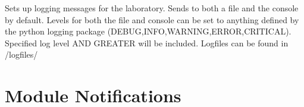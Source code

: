 \documentclass[letterpaper,10pt,english]{sphinxmanual}
\begin{document}

\begin{fulllineitems}
\label{\detokenize{source/laboratory.utils:laboratory.utils.loggers.lab}}
Sets up logging messages for the laboratory. Sends to both a file and the console by default. Levels for both the file and console can be set to anything defined by the
python logging package (DEBUG,INFO,WARNING,ERROR,CRITICAL). Specified log level AND GREATER will be included. Logfiles can be found in /logfiles/

\end{fulllineitems}



\section{Module Notifications}
\label{\detokenize{source/laboratory.utils:module-laboratory.utils.notifications}}\label{\detokenize{source/laboratory.utils:module-notifications}}
\end{document}
